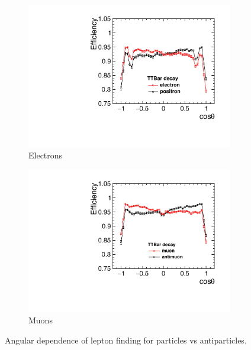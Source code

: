 \begin{figure}
  \centering
  \begin{subfigure}{.5\textwidth}
    \centering
    \includegraphics[width=0.99\textwidth]{TopAnalysis/figures/ElectronEfficiencys.pdf}
    \caption[Charge Tagging Efficiency]{Electrons}
    \label{fig:electronefficiency}
  \end{subfigure}%
  \begin{subfigure}{.5\textwidth}
    \centering
    \includegraphics[width=0.99\textwidth]{TopAnalysis/figures/MuonEfficiencys.pdf}
    \caption[Charge Tagging Efficiency]{Muons}
    \label{fig:muonefficiency}
  \end{subfigure}
  \caption{Angular dependence of lepton finding for particles vs antiparticles.}
  \label{fig:chargeEfficiencies}
\end{figure}

